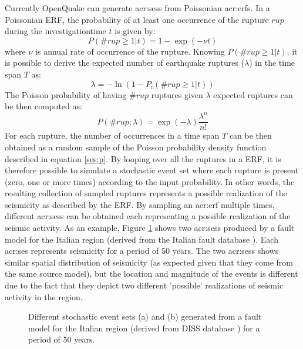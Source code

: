 Currently OpenQuake can generate \glspl{acr:ses} from Poissonian 
\glspl{acr:erf}. 
%
In a Poissonian ERF, the probability of at least one occurrence 
of the rupture $rup$ during the \gls{investigationtime} $t$ is given by:
%
\begin{equation}
P(\#rup\geq1|t) = 1 - \exp(-\nu t)
\end{equation} 
where $\nu$ is annual rate of occurrence of the rupture. Knowing 
$P(\#rup\geq1|t)$, it is possible to derive the expected number of 
earthquake ruptures ($\lambda$) in the time span $T$  as:
\begin{equation}
\lambda = - \ln(1 - P_{i}(\#rup\geq1|t))
\end{equation} 
The Poisson probability of having $\#rup$ ruptures given $\lambda$ 
expected ruptures can be then computed as:
%
\begin{equation}
P(\#rup;\lambda) = \exp(-\lambda)\frac{\lambda^{n}}{n!}
\label{ses:p}
\end{equation}
%
For each rupture, the number of occurrences in a time span $T$ 
can be then obtained as a random sample of the Poisson probability 
density function described in equation \ref{ses:p}. By looping over
all the ruptures in a ERF, it is therefore possible to simulate a 
stochastic event set where each rupture is present (zero, one or 
more times) according to the input probability. 
%
In other words, the resulting collection of sampled ruptures represents 
a possible realization of the seismicity as described by the ERF. 
%
By sampling an \gls{acr:erf} multiple times, different \glspl{acr:ses} 
can be obtained each representing a possible realization of the seismic 
activity. 
As an example, Figure \ref{ses_italy} shows two \glspl{acr:ses} 
produced by a fault model for the Italian region (derived from the 
Italian fault database \citep{basili2008}). 
%
Each \gls{acr:ses} represents seismicity for a period of 50 years. The two 
\glspl{acr:ses} shows similar spatial distribution of seismicity (as 
expected given that they come from the same source model), but the 
location and magnitude of the events is different due to the fact that 
they depict two different 'possible' realizations of seismic activity 
in the region.
\begin{figure}[!htbp]
\begin{center}
\caption{Different stochastic event sets (a) and (b) generated from a 
fault model for the Italian region (derived from DISS database 
\citep{basili2008}) for a period of 50 years.}
\label{ses_italy}
\end{center}
\end{figure}
%
